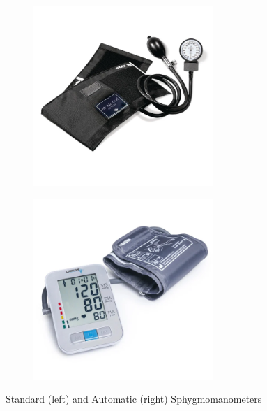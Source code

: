 \begin{figure}[b]
    \centering
    \begin{subfigure}[b]{0.45\textwidth}
        \centering
        \includegraphics[width=0.75\textwidth]{images/abp/sphyg}
    \end{subfigure}
    \hfill
    \begin{subfigure}[b]{0.45\textwidth}
        \centering
        \includegraphics[width=0.75\textwidth]{images/abp/auto_sphyg}
    \end{subfigure}
    \caption{Standard (left) and Automatic (right) Sphygmomanometers}
    \label{fig:sphygmomanometers}
\end{figure}

